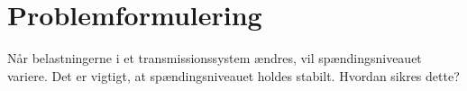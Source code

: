 
\chapter{Problemformulering}
Når belastningerne i et transmissionssystem ændres, vil spændingsniveauet variere. Det er vigtigt, at spændingsniveauet holdes stabilt. Hvordan sikres dette?